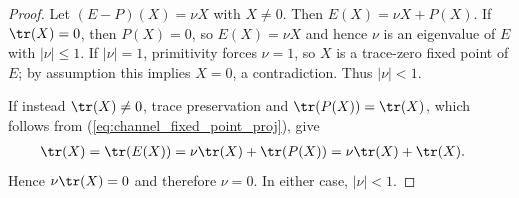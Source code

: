 \begin{proof}
    \leanok
    Let $(E-P)(X)=\nu X$ with $X\neq0$. Then
    $E(X)=\nu X+P(X)$. If $\tr(X)=0$, then $P(X)=0$, so
    $E(X)=\nu X$ and hence $\nu$ is an eigenvalue of $E$ with
    $|\nu|\le1$. If $|\nu|=1$, primitivity forces $\nu=1$, so $X$ is a
    trace-zero fixed point of $E$; by assumption this implies $X=0$, a
    contradiction. Thus $|\nu|<1$.

    If instead $\tr(X)\neq0$, trace preservation and
    $\tr(P(X))=\tr(X)$, which follows from
    (\ref{eq:channel_fixed_point_proj}), give
    \begin{align}
        \tr(X)
         & =\tr(E(X))
        =\nu\tr(X)+\tr(P(X))
        =\nu\tr(X)+\tr(X).
        \notag
    \end{align}
    Hence $\nu\tr(X)=0$ and therefore $\nu=0$. In either case,
    $|\nu|<1$.
\end{proof}
